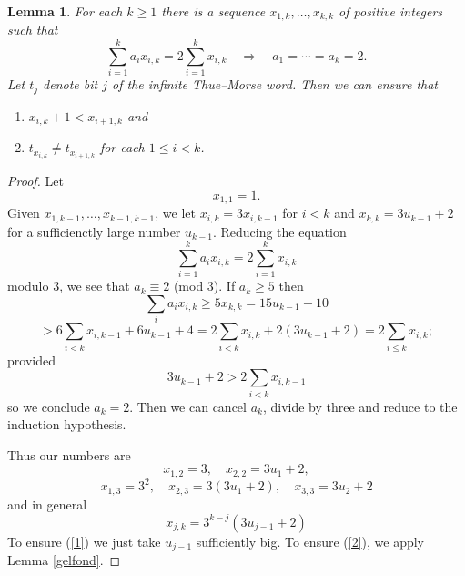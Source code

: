 \documentclass[12pt]{article}
\theoremstyle{plain}
\newtheorem{lem}[thm]{Lemma}
\theoremstyle{definition}
\theoremstyle{remark}
\begin{document}
			\begin{lem}\label{triple9:12:17}
				For each $k\ge 1$ there is a sequence $x_{1,k}, \ldots, x_{k,k}$ of positive integers such that
				\[
					\sum_{i=1}^k a_i x_{i,k}
					=2\sum_{i=1}^k x_{i,k}
					 \quad\Longrightarrow\quad a_1 = \cdots = a_k = 2.
				\]
				Let $t_j$ denote bit $j$ of the infinite Thue--Morse word.
				Then we can ensure that
				\begin{enumerate}
					\item \label{1} $x_{i,k}+1<x_{i+1,k}$ and
					\item \label{2} $t_{x_{i,k}}\ne t_{x_{i+1,k}}$ for each $1\le i<k$.
				\end{enumerate}
			\end{lem}
			\begin{proof}
				Let
				\[
					x_{1,1}=1.
				\]
				Given $x_{1,k-1}, \ldots, x_{k-1,k-1}$, we let $x_{i,k}=3x_{i,k-1}$ for $i<k$ and $x_{k,k}=3u_{k-1}+2$
				for a sufficienctly large number $u_{k-1}$.
				Reducing the equation
				\[
				\sum_{i=1}^k a_i x_{i,k}
				=2\sum_{i=1}^k x_{i,k}
				\]
				modulo 3, we see that $a_k\equiv 2$ (mod $3$). If $a_k\ge 5$ then
				\[
					\sum_i a_i x_{i,k}\ge 5x_{k,k}=15u_{k-1}+10
				\]
				\[
					> 6\sum_{i<k}x_{i,k-1} + 6u_{k-1} +4 = 2\sum_{i<k} x_{i,k}+2(3u_{k-1}+2) = 2\sum_{i\le k}x_{i,k};
				\]
				provided
				\[
					3u_{k-1}+2> 2\sum_{i<k}x_{i,k-1}
				\]
				so we conclude $a_k=2$.
				Then we can cancel $a_k$, divide by three and reduce to the induction hypothesis.


				Thus our numbers are
				\[
				 	x_{1,2}=3,\quad x_{2,2}=3u_1+2,
				\]
				\[
				 	x_{1,3}=3^2,\quad x_{2,3}=3(3u_1+2),\quad x_{3,3}=3u_2+2
				\]
				and in general
				\[
					x_{j,k}=3^{k-j}(3u_{j-1}+2)
				\]
				To ensure (\ref{1}) we just take $u_{j-1}$ sufficiently big.
				To ensure (\ref{2}), we apply Lemma \ref{gelfond}.
			\end{proof}
\end{document}
